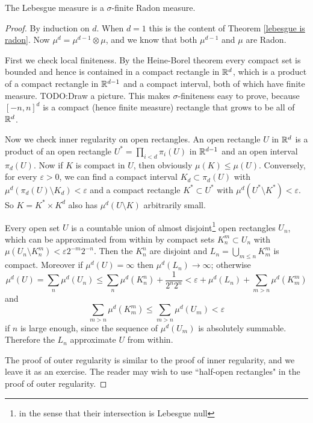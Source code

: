\begin{theorem}
\label{lebesgue is radon 2}
The Lebesgue measure is a $\sigma$-finite Radon measure.
\end{theorem}
\begin{proof}
By induction on $d$. When $d = 1$ this is the content of Theorem \ref{lebesgue is radon}.
Now $\mu^d = \mu^{d-1} \otimes \mu$, and we know that both $\mu^{d-1}$ and $\mu$ are Radon.

First we check local finiteness. By the Heine-Borel theorem every compact set is bounded and hence is contained in a compact rectangle in $\mathbb{R}^d$, which is a product of a compact rectangle in $\mathbb{R}^{d-1}$ and a compact interval, both of which have finite measure.
TODO:Draw a picture.
This makes $\sigma$-finiteness easy to prove, because $[-n, n]^d$ is a compact (hence finite measure) rectangle that grows to be all of $\mathbb{R}^d$.

Now we check inner regularity on open rectangles.
An open rectangle $U$ in $\mathbb{R}^d$ is a product of an open rectangle $U^* = \prod_{i<d} \pi_i(U)$ in $\mathbb{R}^{d-1}$ and an open interval $\pi_d(U)$.
Now if $K$ is compact in $U$, then obviously $\mu(K) \leq \mu(U)$.
Conversely, for every $\varepsilon > 0$, we can find a compact interval $K_d \subset \pi_d(U)$ with $\mu^d(\pi_d(U) \setminus K_d) < \varepsilon$ and a compact rectangle $K^* \subset U^*$ with $\mu^d(U^* \setminus K^*) < \varepsilon$. So $K = K^* \times K^d$ also has $\mu^d(U \setminus K)$ arbitrarily small.

Every open set $U$ is a countable union of almost disjoint\footnote{in the sense that their intersection is Lebesgue null} open rectangles $U_n$, which can be approximated from within by compact sets $K_n^m \subset U_n$ with $\mu(U_n \setminus K_n^m) < \varepsilon 2^{-m}2^{-n}$. Then the $K_n^n$ are disjoint and $L_n = \bigcup_{m \leq n} K_m^m$ is compact.
Moreover if $\mu^d(U) = \infty$ then $\mu^d(L_n) \to \infty$; otherwise
$$\mu^d(U) = \sum_n \mu^d(U_n) \leq \sum_n \mu^d(K_n^n) + \frac{1}{2^n2^n} < \varepsilon + \mu^d(L_n) + \sum_{m > n} \mu^d(K_m^m)$$
and
$$\sum_{m > n} \mu^d(K_m^m) \leq \sum_{m > n} \mu^d(U_m) < \varepsilon$$
if $n$ is large enough, since the sequence of $\mu^d(U_m)$ is absolutely summable.
Therefore the $L_n$ approximate $U$ from within.

The proof of outer regularity is similar to the proof of inner regularity, and we leave it as an exercise.
The reader may wish to use ``half-open rectangles" in the proof of outer regularity.
\end{proof}

